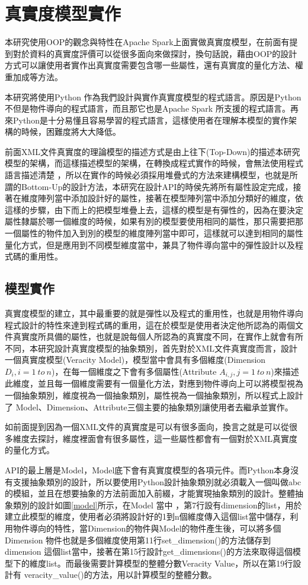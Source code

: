\section{真實度模型實作}
本研究使用OOP的觀念與特性在Apache Spark上面實做真實度模型，在前面有提到對於資料的真實度評價可以從很多面向來做探討，換句話說，藉由OOP的設計方式可以讓使用者實作出真實度需要包含哪一些屬性，還有真實度的量化方法、權重加成等方法。\\\par
本研究將使用Python 作為我們設計與實作真實度模型的程式語言。原因是Python 不但是物件導向的程式語言，而且那它也是Apache Spark 所支援的程式語言。再來Python是十分易懂且容易學習的程式語言，這樣使用者在理解本模型的實作架構的時候，困難度將大大降低。\\\par
前面XML文件真實度的理論模型的描述方式是由上往下(Top-Down)的描述本研究模型的架構，而這樣描述模型的架構，在轉換成程式實作的時候，會無法使用程式語言描述清楚 ，所以在實作的時候必須採用堆疊式的方法來建構模型，也就是所謂的Bottom-Up的設計方法，本研究在設計API的時侯先將所有屬性設定完成，接著在維度陣列當中添加設計好的屬性，接著在模型陣列當中添加分類好的維度，依這樣的步驟，由下而上的把模型堆疊上去，這樣的模型是有彈性的，因為在要決定屬性隸屬於哪一個維度的時候，如果有別的模型要使用相同的屬性，那只需要把那一個屬性的物件加入到別的模型的維度陣列當中即可，這樣就可以達到相同的屬性量化方式，但是應用到不同模型維度當中，兼具了物件導向當中的彈性設計以及程式碼的重用性。
\subsection{模型實作}
真實度模型的建立，其中最重要的就是彈性以及程式的重用性，也就是用物件導向程式設計的特性來達到程式碼的重用，這在於模型是使用者決定他所認為的兩個文件真實度所具備的屬性，也就是說每個人所認為的真實度不同，在實作上就會有所不同，本研究設計真實度模型的抽象類別，首先對於XML文件真實度而言，設計一個真實度模型(Veracity Model)，模型當中會具有多個維度(Dimension $D_i,  i=1\ to\ n$)，在每一個維度之下會有多個屬性(Attribute $A_{i, j}, j=1\ to\ n$)來描述此維度，並且每一個維度需要有一個量化方法，對應到物件導向上可以將模型視為一個抽象類別，維度視為一個抽象類別，屬性視為一個抽象類別，所以程式上設計了 Model、Dimension、Attribute三個主要的抽象類別讓使用者去繼承並實作。\\\par
如前面提到因為一個XML文件的真實度是可以有很多面向，換言之就是可以從很多維度去探討，維度裡面會有很多屬性，這一些屬性都會有一個對於XML真實度的量化方式。\\\par
API的最上層是Model，Model底下會有真實度模型的各項元件。而Python本身沒有支援抽象類別的設計，所以要使用Python設計抽象類別就必須載入一個叫做abc的模組，並且在想要抽象的方法前面加入前綴，才能實現抽象類別的設計。整體抽象類別的設計如圖\ref{model}所示，在Model 當中 ，第7行設有dimension的list，用於建立此模型的維度，使用者必須將設計好的1到n個維度傳入這個list當中儲存，利用物件導向的特性，當Dimension的物件與Model的物件產生後，可以將多個Dimension 物件也就是多個維度使用第11行set\_dimension()的方法儲存到 dimension 這個list當中，接著在第15行設計get\_dimensions()的方法來取得這個模型下的維度list。而最後需要計算模型的整體分數Veracity Value，所以在第19行設計有 veracity\_value()的方法，用以計算模型的整體分數。

